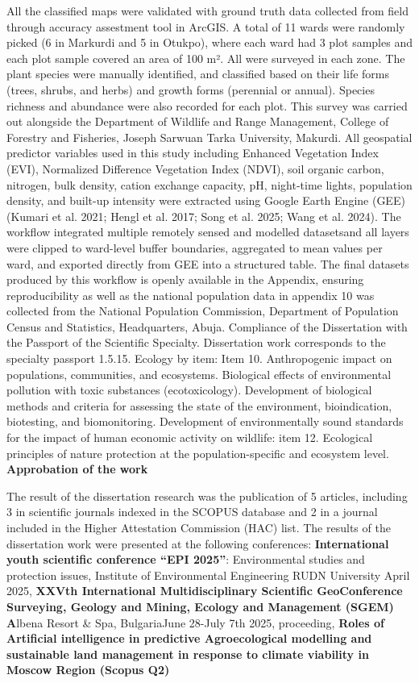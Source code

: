 All the classified maps were validated with ground truth data collected from field through accuracy assestment tool in ArcGIS. A total of 11 wards were randomly picked (6 in Markurdi and 5 in Otukpo), where each ward had 3 plot samples and each plot sample covered an area of 100 m². All were surveyed in each zone. The plant species were manually identified, and classified based on their life forms (trees, shrubs, and herbs) and growth forms (perennial or annual). Species richness and abundance were also recorded for each plot. This survey was carried out alongside the Department of Wildlife and Range Management, College of Forestry and Fisheries, Joseph Sarwuan Tarka University, Makurdi. All geospatial predictor variables used in this study including Enhanced Vegetation Index (EVI), Normalized Difference Vegetation Index (NDVI), soil organic carbon, nitrogen, bulk density, cation exchange capacity, pH, night-time lights, population density, and built-up intensity were extracted using Google Earth Engine (GEE)(Kumari et al. 2021; Hengl et al. 2017; Song et al. 2025; Wang et al. 2024).
The workflow integrated multiple remotely sensed and modelled datasetsand all layers were clipped to ward-level buffer boundaries, aggregated to mean values per ward, and exported directly from GEE into a structured table. The final datasets produced by this workflow is openly available in the Appendix, ensuring reproducibility as well as the national population data in appendix 10 was collected from the National Population Commission, Department of Population Census and Statistics, Headquarters, Abuja.
Compliance of the Dissertation with the Passport of the Scientific Specialty.
Dissertation work corresponds to the specialty passport 1.5.15. Ecology by item: Item 10. Anthropogenic impact on populations, communities, and ecosystems. Biological effects of environmental pollution with toxic substances (ecotoxicology). Development of biological methods and criteria for assessing the state of the environment, bioindication, biotesting, and biomonitoring. Development of environmentally sound standards for the impact of human economic activity on wildlife: item 12. Ecological principles of nature protection at the population-specific and ecosystem level.
{}\textbf{Approbation of the work}

The result of the dissertation research was the publication of 5 articles, including 3 in scientific journals indexed in the SCOPUS database and 2 in a journal included in the Higher Attestation Commission (HAC) list. The results of the dissertation work were presented at the following conferences: \textbf{International youth scientific conference ``EPI 2025''}: Environmental studies and protection issues, Institute of Environmental Engineering RUDN University April 2025, \textbf{XXVth International Multidisciplinary Scientific GeoConference Surveying, Geology and Mining, Ecology and Management (SGEM) A}lbena Resort \& Spa, BulgariaJune 28-July 7th 2025, proceeding, \textbf{Roles of Artificial intelligence in predictive Agroecological modelling and sustainable land management in response to climate viability in Moscow Region (Scopus Q2)}

